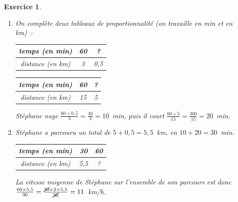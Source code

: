 \documentclass[10pt]{article}
\newtheorem{exo}{Exercice}
\begin{document}
\begin{exo}

\begin{enumerate}
\item On complète deux tableaux de proportionnalité (on travaille en min et en km)~:

\begin{multicols}{2}

\begin{center}
\begin{tabular}{|c|c|c|}\hline
temps (en min)& 60&? \\ \hline 
distance (en km)&3& 0,5 \\ \hline
\end{tabular}


\begin{tabular}{|c|c|c|}\hline
temps (en min)& 60&? \\ \hline 
distance (en km)&15& 5 \\ \hline
\end{tabular}
\end{center}

\end{multicols}

Stéphane nage $\frac{60\times 0,5}{3}=\frac{30}{3}=10$~min, puis il court $\frac{60\times 5}{15}=\frac{300}{15}=20$~min.


\item Stéphane a parcouru un total de $5+0,5=5,5$~km, en $10+20=30$~min.

\begin{center}
\begin{tabular}{|c|c|c|}\hline
temps (en min)& 30&60 \\ \hline 
distance (en km)&5,5& ? \\ \hline
\end{tabular}
\end{center}

La vitesse moyenne de Stéphane sur l’ensemble de son parcours est donc $\frac{60\times 5,5}{30}=\frac{\cancel{30}\times 2\times 5,5}{\cancel{30}}=11$~km/h.
\end{enumerate}
\end{exo}
\end{document}

